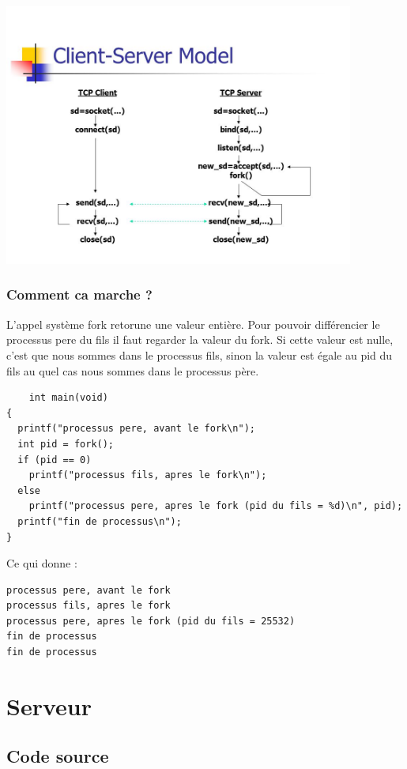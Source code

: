 \documentclass[a4paper,11pt]{report}
\begin{document}
\includegraphics[width=115mm]{./resources/socketFork.jpg}

\subsection{Comment ca marche ?}
L'appel système fork retorune une valeur entière. Pour pouvoir différencier le processus pere du fils il faut regarder la valeur du fork. Si cette valeur est nulle, c'est que nous sommes dans le processus fils, sinon la valeur est égale au pid du fils au quel cas nous sommes dans le processus père.


\begin{lstlisting} 
    int main(void)
{
  printf("processus pere, avant le fork\n");
  int pid = fork();
  if (pid == 0)
    printf("processus fils, apres le fork\n");
  else
    printf("processus pere, apres le fork (pid du fils = %d)\n", pid);
  printf("fin de processus\n");
}
\end{lstlisting}
Ce qui donne :
\begin{lstlisting} 
processus pere, avant le fork
processus fils, apres le fork
processus pere, apres le fork (pid du fils = 25532)
fin de processus
fin de processus
\end{lstlisting}

    
\chapter{Serveur}
\textbf{} 
\section{Code source}

\end{document}
